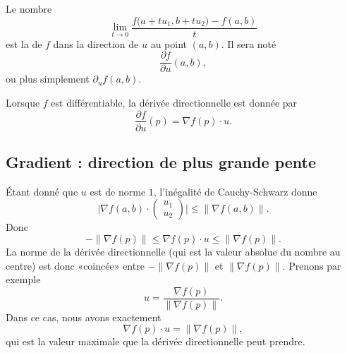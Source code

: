 \begin{definition}
    Le nombre
    \begin{equation}
        \lim_{t\to 0} \frac{ f\big( a+tu_1,b+tu_2 \big)-f(a,b) }{ t }
    \end{equation}
    est la  de $f$ dans la direction de $u$ au point $(a,b)$. Il sera noté
    \begin{equation}
        \frac{ \partial f }{ \partial u }(a,b),
    \end{equation}
    ou plus simplement $\partial_uf(a,b)$.
\end{definition}

Lorsque $f$ est différentiable, la dérivée directionnelle est donnée par
\begin{equation}        \label{EqDerDirnablau}
    \frac{ \partial f }{ \partial u }(p)=\nabla f(p)\cdot u.
\end{equation}

\subsection{Gradient : direction de plus grande pente}

Étant donné que $u$ est de norme $1$, l'inégalité de Cauchy-Schwarz donne
\begin{equation}
    \big| \nabla f(a,b)\cdot \begin{pmatrix}
        u_1    \\
        u_2
    \end{pmatrix}\big|\leq \| \nabla f(a,b) \|.
\end{equation}
Donc
\begin{equation}
    -\| \nabla f(p) \|\leq \nabla f(p)\cdot u\leq\| \nabla f(p) \|.
\end{equation}
La norme de la dérivée directionnelle (qui est la valeur absolue du nombre au centre) est donc «coincée» entre $-\| \nabla f(p) \|$ et $\| \nabla f(p) \|$. Prenons par exemple
\begin{equation}
    u=\frac{ \nabla f(p) }{ \| \nabla f(p) \| }.
\end{equation}
Dans ce cas, nous avons exactement
\begin{equation}
    \nabla f(p)\cdot u=\| \nabla f(p) \|,
\end{equation}
qui est la valeur maximale que la dérivée directionnelle peut prendre.

